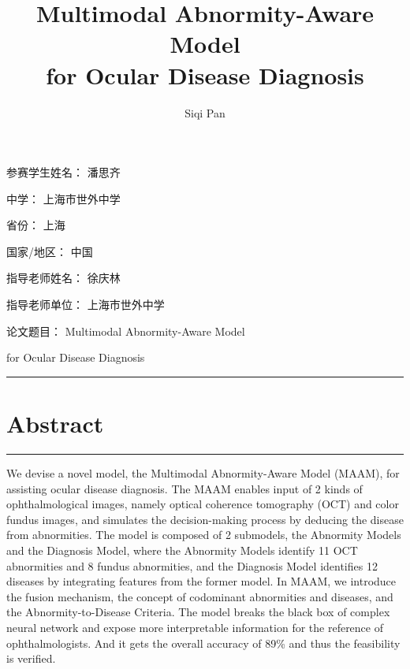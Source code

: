 \documentclass{article}
\begin{document}
	\vspace{5cm}

	{\fontsize{20pt}{20pt}\selectfont 参赛学生姓名： 潘思齐\\}
	
	\vspace{0.6cm}
	{\fontsize{20pt}{20pt}\selectfont 中学： 上海市世外中学}
	
	\vspace{1cm}
	{\fontsize{20pt}{20pt}\selectfont 省份： 上海}
	
	\vspace{1cm}
	{\fontsize{20pt}{20pt}\selectfont 国家/地区： 中国}
	
	\vspace{1cm}
	{\fontsize{20pt}{20pt}\selectfont 指导老师姓名： 徐庆林}
	
	\vspace{1cm}
	{\fontsize{20pt}{20pt}\selectfont 指导老师单位： 上海市世外中学}
	
	\vspace{1cm}
	{\fontsize{20pt}{20pt}\selectfont 论文题目： }
	{\fontsize{16pt}{16pt}\selectfont Multimodal Abnormity-Aware Model}
	
	\vspace{0.2cm}
	{\fontsize{16pt}{16pt}\selectfont \hspace{3.7cm} for Ocular Disease Diagnosis}
	
	\pagebreak
	
	\title{\vspace{-2.25cm} Multimodal Abnormity-Aware Model\\for Ocular Disease Diagnosis}
	\vspace{-0.5cm}
	\author{Siqi Pan}
	\vspace{-0.5cm}
	\date{}
	\maketitle
	
	\vspace{-0.7cm}
	\hrule
	\vspace{-0.3cm}
	\section*{Abstract}
	\hrule
	\vspace{0.3cm}
	We devise a novel model, the Multimodal Abnormity-Aware Model (MAAM), for assisting ocular disease diagnosis. The MAAM enables input of 2 kinds of ophthalmological images, namely optical coherence tomography (OCT) and color fundus images, and simulates the decision-making process by deducing the disease from abnormities. The model is composed of 2 submodels, the Abnormity Models and the Diagnosis Model, where the Abnormity Models identify 11 OCT abnormities and 8 fundus abnormities, and the Diagnosis Model identifies 12 diseases by integrating features from the former model. In MAAM, we introduce the fusion mechanism, the concept of codominant abnormities and diseases, and the Abnormity-to-Disease Criteria.  The model breaks the black box of complex neural network and expose more interpretable information for the reference of ophthalmologists. And it gets the overall accuracy of 89\% and thus the feasibility is verified.
	
\end{document}
